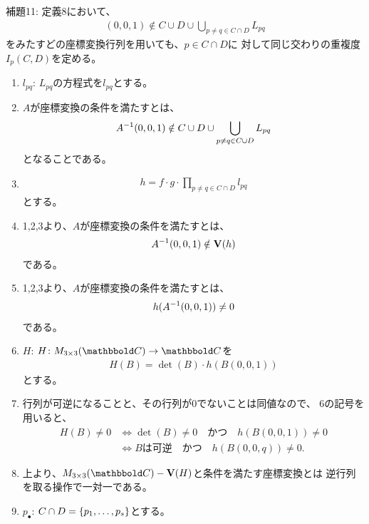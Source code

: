 \begin{framed}
  補題11:
  定義8において、
  \begin{align}
    (0,0,1)\notin C\cup D \cup \bigcup_{p\neq q \in C\cap D}L_{pq}
  \end{align}
  をみたすどの座標変換行列を用いても、$p\in C\cap D$に
  対して同じ交わりの重複度$I_p(C,D)$を定める。
\end{framed}
\begin{myproof}
  \begin{enumerate}
    \item $l_{pq}$: $L_{pq}$の方程式を$l_{pq}$とする。
    \item $A$が座標変換の条件を満たすとは、
    \begin{align}
      A^{-1}(0,0,1) \notin C\cup D \cup \bigcup_{p\neq q \in C\cup D} L_{pq}
    \end{align}
    となることである。
    \item
    \begin{align}
      h=f\cdot g\cdot \prod_{p\neq q \in C\cap D}l_{pq}
    \end{align}
    とする。
    \item
    1,2,3より、$A$が座標変換の条件を満たすとは、
    \begin{align}
      A^{-1}(0,0,1) \notin \textbf V(h)
    \end{align}
    である。
    \item
    1,2,3より、$A$が座標変換の条件を満たすとは、
    \begin{align}
      h(A^{-1}(0,0,1))\neq 0
    \end{align}
    である。
    \item $H$:
    $H\colon M_{3\times 3}(\C) \to \C$を
    \begin{align}
      H(B) = \det(B) \cdot h(B(0,0,1))
    \end{align}
    とする。
    \item
    行列が可逆になることと、その行列が0でないことは同値なので、
    6の記号を用いると、
    \begin{align}
      H(B) \neq 0
      &\iff
      \det(B)\neq 0 \quad かつ \quad h(B(0,0,1))\neq 0 \\
      &\iff
      Bは可逆 \quad かつ \quad h(B(0,0,q)) \neq 0.
    \end{align}
    \item
    上より、$M_{3\times 3}(\C)-\var(H)$と条件を満たす座標変換とは
    逆行列を取る操作で一対一である。
    \item $p_\bullet$:
    $C\cap D = \left\{p_1,\dots,p_s\right\}$とする。

\end{enumerate}
\end{myproof}
